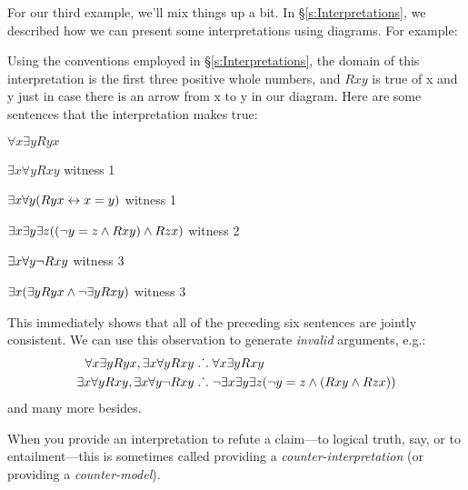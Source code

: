 For our third example, we'll mix things up a bit. In \S\ref{s:Interpretations}, we described how we can present some interpretations using diagrams. For example:
\begin{center}
\end{center}
Using the conventions employed in \S\ref{s:Interpretations}, the domain of this interpretation is the first three positive whole numbers, and $Rxy$ is true of x and y just in case there is an arrow from x to y in our diagram. Here are some sentences that the interpretation makes true:
	\begin{ebullet}
		\item $\forall x \exists y Ryx$ 
		\item $\exists x \forall y Rxy$ \hfill witness 1
		\item $\exists x \forall y (Ryx \leftrightarrow x = y)$ \hfill witness 1
		\item $\exists x \exists y \exists z ((\neg y = z \wedge Rxy) \wedge Rzx)$ \hfill witness 2
		\item $\exists x \forall y \neg Rxy$ \hfill witness 3
		\item $\exists x (\exists y Ryx \wedge \neg \exists y Rxy)$ \hfill witness 3
	\end{ebullet}
This immediately shows that all of the preceding six sentences are jointly consistent. We can use this observation to generate \emph{invalid} arguments, e.g.:
	\begin{align*}
		\forall x \exists y Ryx, \exists x \forall y Rxy  &\mathrel{\ldotp\dot{}\,\ldotp}  \forall x \exists y Rxy\\
		\exists x \forall y Rxy, \exists x \forall y \neg Rxy & \mathrel{\ldotp\dot{}\,\ldotp} \neg \exists x \exists y \exists z (\neg y = z \wedge (Rxy \wedge Rzx))
	\end{align*}
and many more besides.

When you provide an interpretation to refute a claim---to logical truth, say, or to entailment---this is sometimes called providing a \emph{counter-interpretation} (or providing a \emph{counter-model}).

